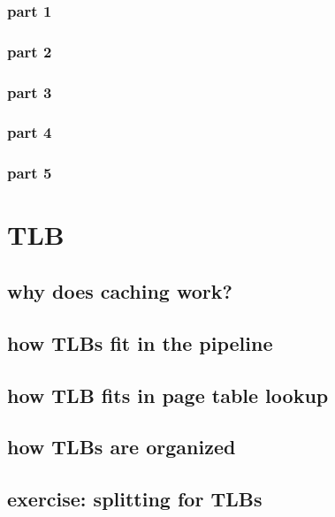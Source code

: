 \subsubsection{part 1}

\subsubsection{part 2}

\subsubsection{part 3}


\subsubsection{part 4}

\subsubsection{part 5}



\section{TLB}
\subsection{why does caching work?}


\subsection{how TLBs fit in the pipeline}


\subsection{how TLB fits in page table lookup}


\subsection{how TLBs are organized}

\subsection{exercise: splitting for TLBs}
